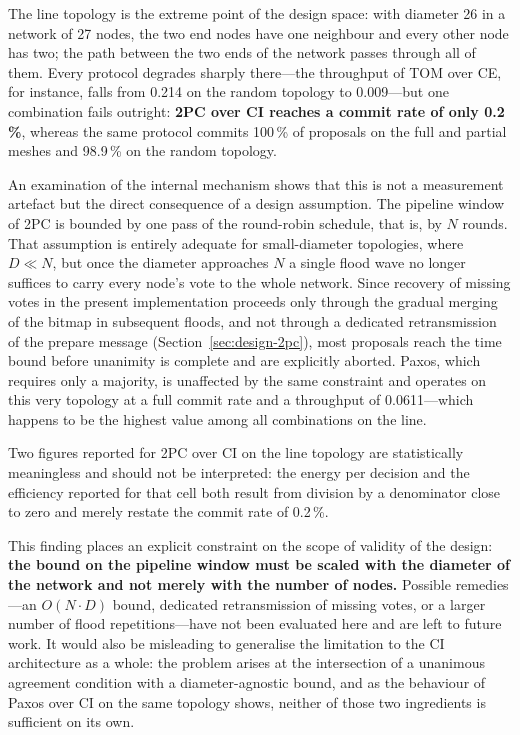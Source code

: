 \documentclass[journal]{IEEEtran}
\newcommand{\CI}{CI}                      %
\newcommand{\CE}{CE}                      %
\newcommand{\Nnodes}{N}                   %
\newcommand{\Diam}{D}                     %
\begin{document}
The line topology is the extreme point of the design space: with diameter
26 in a network of 27 nodes, the two end nodes have one neighbour and every
other node has two; the path between the two ends of the network passes
through all of them. Every
protocol degrades sharply there---the throughput of TOM over \CE, for
instance, falls from 0.214 on the random topology to 0.009---but one
combination fails outright: \textbf{2PC over \CI{} reaches a commit rate of
only 0.2\,\%}, whereas the same protocol commits 100\,\% of proposals on
the full and partial meshes and 98.9\,\% on the random topology.

An examination of the internal mechanism shows that this is not a
measurement artefact but the direct consequence of a design assumption.
The pipeline window of 2PC is bounded by one pass of the round-robin
schedule, that is, by $\Nnodes$ rounds. That assumption is entirely
adequate for small-diameter topologies, where $\Diam \ll \Nnodes$, but
once the diameter approaches $\Nnodes$ a single flood wave no longer
suffices to carry every node's vote to the whole network. Since recovery
of missing votes in the present implementation proceeds only through the
gradual merging of the bitmap in subsequent floods, and not through a
dedicated retransmission of the prepare message
(Section~\ref{sec:design-2pc}), most proposals reach the time bound before
unanimity is complete and are explicitly aborted. Paxos, which requires
only a majority, is unaffected by the same constraint and operates on this
very topology at a full commit rate and a throughput of 0.0611---which
happens to be the highest value among all combinations on the line.

Two figures reported for 2PC over \CI{} on the line topology are
statistically meaningless and should not be interpreted: the energy per
decision and the efficiency reported for that cell both result from division
by a denominator close to zero and merely restate the commit rate of
0.2\,\%.

This finding places an explicit constraint on the scope of validity of the
design: \textbf{the bound on the pipeline window must be scaled with the
diameter of the network and not merely with the number of nodes.}
Possible remedies---an $O(\Nnodes \cdot \Diam)$ bound, dedicated
retransmission of missing votes, or a larger number of flood
repetitions---have not been evaluated here and are left to future work. It
would also be misleading to generalise the limitation to the \CI{}
architecture as a whole: the problem arises at the intersection of a
unanimous agreement condition with a diameter-agnostic bound, and as the
behaviour of Paxos over \CI{} on the same topology shows, neither of those
two ingredients is sufficient on its own.
\end{document}
